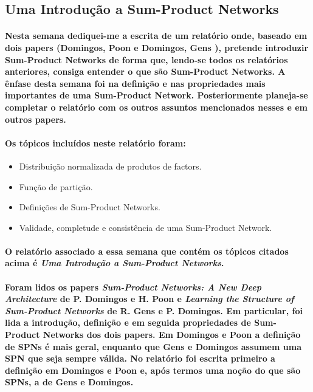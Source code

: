 \documentclass[a4paper,10pt]{article}
\theoremstyle{plain}
\begin{document}
\subsection{Uma Introdução a Sum-Product Networks}

\paragraph{
  Nesta semana dediquei-me a escrita de um relatório onde, baseado em dois papers (Domingos, Poon
  \cite{poon-domingos} e Domingos, Gens \cite{gens-domingos}), pretende introduzir Sum-Product
  Networks de forma que, lendo-se todos os relatórios anteriores, consiga entender o que são
  Sum-Product Networks. A ênfase desta semana foi na definição e nas propriedades mais importantes
  de uma Sum-Product Network. Posteriormente planeja-se completar o relatório com os outros
  assuntos mencionados nesses e em outros papers.
}

\paragraph{
  Os tópicos incluídos neste relatório foram:
}

\begin{itemize}
  \item Distribuição normalizada de produtos de factors.
  \item Função de partição.
  \item Definições de Sum-Product Networks.
  \item Validade, completude e consistência de uma Sum-Product Network.
\end{itemize}

\paragraph{
  O relatório associado a essa semana que contém os tópicos citados acima é \textit{Uma Introdução
  a Sum-Product Networks}\cite{report-9}.
}

\paragraph{
  Foram lidos os papers \textit{Sum-Product Networks: A New Deep Architecture}\cite{poon-domingos}
  de P. Domingos e H. Poon e \textit{Learning the Structure of Sum-Product Networks}
  \cite{gens-domingos} de R. Gens e P. Domingos. Em particular, foi lida a introdução, definição
  e em seguida propriedades de Sum-Product Networks dos dois papers. Em Domingos e Poon a definição
  de SPNs é mais geral, enquanto que Gens e Domingos assumem uma SPN que seja sempre válida. No
  relatório foi escrita primeiro a definição em Domingos e Poon e, após termos uma noção do que
  são SPNs, a de Gens e Domingos.
}
\end{document}
